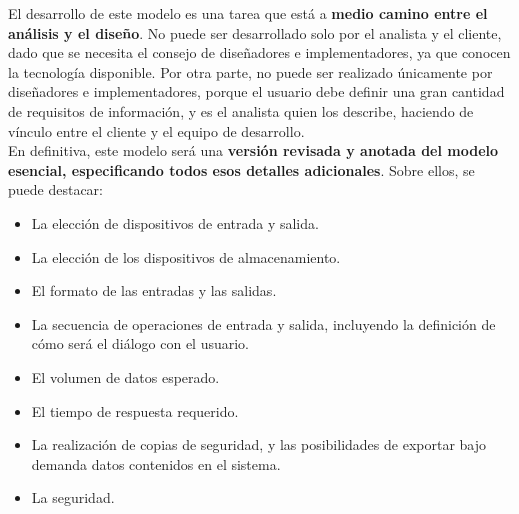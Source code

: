 El desarrollo de este modelo es una tarea que está a \textbf{medio camino entre el análisis y el diseño}. No puede ser desarrollado solo por el analista y el cliente, dado que se necesita el consejo de diseñadores e implementadores, ya que conocen la tecnología disponible. Por otra parte, no puede ser realizado únicamente por diseñadores e implementadores, porque el usuario debe definir una gran cantidad de requisitos de información, y es el analista quien los describe, haciendo de vínculo entre el cliente y el equipo de desarrollo.\\

En definitiva, este modelo será una \textbf{versión revisada y anotada del modelo esencial, especificando todos esos detalles adicionales}. Sobre ellos, se puede destacar:

\begin{itemize}
    \item La elección de dispositivos de entrada y salida.
    \item La elección de los dispositivos de almacenamiento.
    \item El formato de las entradas y las salidas.
    \item La secuencia de operaciones de entrada y salida, incluyendo la definición de cómo será el diálogo con el usuario.
    \item El volumen de datos esperado.
    \item El tiempo de respuesta requerido.
    \item La realización de copias de seguridad, y las posibilidades de exportar bajo demanda datos contenidos en el sistema.
    \item La seguridad.
\end{itemize}
